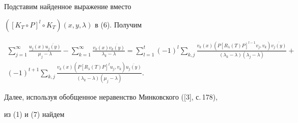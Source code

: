 Подставим найденное выражение вместо


$([K_T\circ P]^l\circ K_T)(x,y,\lambda)$ в (6). Получим


\begin{multline*}


\sum_{j=1}^\infty\frac{u_j(x)\overline{u_j(y)}}{\mu_j-\lambda}-


\sum_{k=1}^\infty\frac{v_k(x)\overline{v_k(y)}}{\lambda_k-\lambda}=


\sum_{l=1}^t(-1)^l\sum_{k,j}


\frac{v_k(x)(P[R_\lambda(T)P]^{l-1}v_j,v_k)\overline{v_j(y)}}


{(\lambda_k-\lambda)(\lambda_j-\lambda)}+ \\


%


(-1)^{t+1}\sum_{k,j}\frac{v_k(x)(P[R_\lambda(T)P]^tu_j,v_k)


\overline{u_j(y)}}{(\lambda_k-\lambda)(\mu_j-\lambda)}.


\end{multline*}


Далее, используя обобщенное неравенство Минковского ([3], с.\,178),


из (1) и (7) найдем


